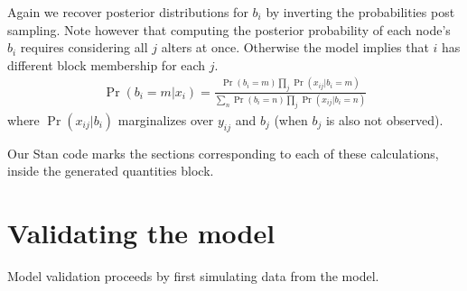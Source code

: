 \documentclass[reqno,12pt,a4paper]{amsart}
\begin{document}
Again we recover posterior distributions for $b_i$ by inverting the probabilities post sampling. Note however that computing the posterior probability of each node's $b_i$ requires considering all $j$ alters at once. Otherwise the model implies that $i$ has different block membership for each $j$.
\begin{align*}
	\Pr(b_i=m|x_{i}) = \frac{ \Pr(b_i=m) \prod_j \Pr(x_{ij}|b_i=m) }{ \sum_n \Pr(b_i=n) \prod_j \Pr(x_{ij}|b_i=n) }
\end{align*}
where $\Pr(x_{ij}|b_i)$ marginalizes over $y_{ij}$ and $b_j$ (when $b_j$ is also not observed).

Our Stan code marks the sections corresponding to each of these calculations, inside the generated quantities block. 

\section{Validating the model}

Model validation proceeds by first simulating data from the model. 


%
%
\end{document}

